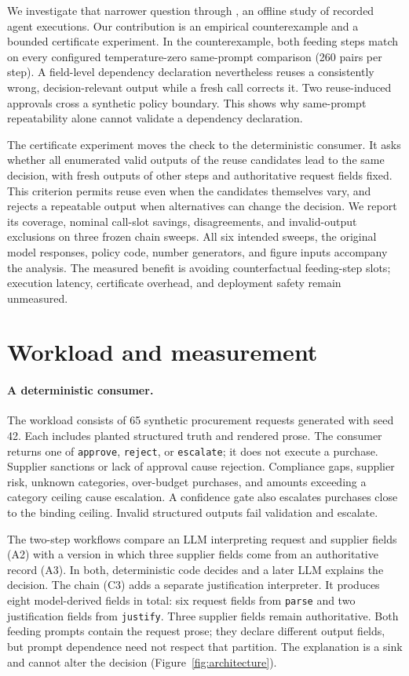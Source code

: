 We investigate that narrower question through \systemname{}, an offline study of recorded agent executions. Our contribution is an empirical counterexample and a bounded certificate experiment. In the counterexample, both feeding steps match on every configured temperature-zero same-prompt comparison (260 pairs per step). A field-level dependency declaration nevertheless reuses a consistently wrong, decision-relevant output while a fresh call corrects it. Two reuse-induced approvals cross a synthetic policy boundary. This shows why same-prompt repeatability alone cannot validate a dependency declaration.

The certificate experiment moves the check to the deterministic consumer. It asks whether all enumerated valid outputs of the reuse candidates lead to the same decision, with fresh outputs of other steps and authoritative request fields fixed. This criterion permits reuse even when the candidates themselves vary, and rejects a repeatable output when alternatives can change the decision. We report its coverage, nominal call-slot savings, disagreements, and invalid-output exclusions on three frozen chain sweeps. All six intended sweeps, the original model responses, policy code, number generators, and figure inputs accompany the analysis. The measured benefit is avoiding counterfactual feeding-step slots; execution latency, certificate overhead, and deployment safety remain unmeasured.

\section{Workload and measurement}
\label{sec:workload}
\paragraph{A deterministic consumer.}
The workload consists of 65 synthetic procurement requests generated with seed 42. Each includes planted structured truth and rendered prose. The consumer returns one of \texttt{approve}, \texttt{reject}, or \texttt{escalate}; it does not execute a purchase. Supplier sanctions or lack of approval cause rejection. Compliance gaps, supplier risk, unknown categories, over-budget purchases, and amounts exceeding a category ceiling cause escalation. A confidence gate also escalates purchases close to the binding ceiling. Invalid structured outputs fail validation and escalate.

The two-step workflows compare an LLM interpreting request and supplier fields (A2) with a version in which three supplier fields come from an authoritative record (A3). In both, deterministic code decides and a later LLM explains the decision. The chain (C3) adds a separate justification interpreter. It produces eight model-derived fields in total: six request fields from \texttt{parse} and two justification fields from \texttt{justify}. Three supplier fields remain authoritative. Both feeding prompts contain the request prose; they declare different output fields, but prompt dependence need not respect that partition. The explanation is a sink and cannot alter the decision (Figure~\ref{fig:architecture}).

